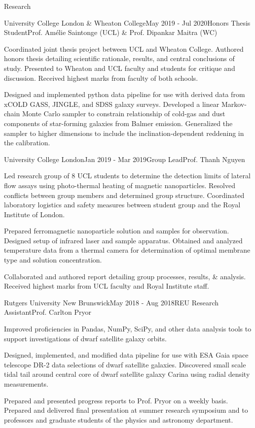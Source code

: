 \documentclass{resume} %
\begin{document}
\begin{rSection}{Research}
\begin{rSubsection}{University College London \& Wheaton College}{May 2019 - Jul 2020}{Honors Thesis Student}{Prof. Am\'{e}lie Saintonge (UCL) \& Prof. Dipankar Maitra (WC)}
\item Coordinated joint thesis project between UCL and Wheaton College. Authored honors thesis detailing scientific rationale, results, and central conclusions of study. Presented to Wheaton and UCL faculty and students for critique and discussion. Received highest marks from faculty of both schools.
\item Designed and implemented python data pipeline for use with derived data from xCOLD GASS, JINGLE, and SDSS galaxy surveys. Developed a linear Markov-chain Monte Carlo sampler to constrain relationship of cold-gas and dust components of star-forming galaxies from Balmer emission. Generalized the sampler to higher dimensions to include the inclination-dependent reddening in the calibration.
\end{rSubsection}
\begin{rSubsection}{University College London}{Jan 2019 - Mar 2019}{Group Lead}{Prof. Thanh Nguyen}
\item Led research group of 8 UCL students to determine the detection limits of lateral flow assays using photo-thermal heating of magnetic nanoparticles. Resolved conflicts between group members and determined group structure. Coordinated laboratory logistics and safety measures between student group and the Royal Institute of London.
\item Prepared ferromagnetic nanoparticle solution and samples for observation. Designed setup of infrared laser and sample apparatus. Obtained and analyzed temperature data from a thermal camera for determination of optimal membrane type and solution concentration.
\item Collaborated and authored report detailing group processes, results, \& analysis. Received highest marks from UCL faculty and Royal Institute staff.
\end{rSubsection}

\begin{rSubsection}{Rutgers University New Brunswick}{May 2018 - Aug 2018}{REU Research Assistant}{Prof. Carlton Pryor}
\item Improved proficiencies in Pandas, NumPy, SciPy, and other data analysis tools to support investigations of dwarf satellite galaxy orbits.
\item Designed, implemented, and modified data pipeline for use with ESA Gaia space telescope DR-2 data selections of dwarf satellite galaxies. Discovered small scale tidal tail around central core of dwarf satellite galaxy Carina using radial density measurements.
\item Prepared and presented progress reports to Prof. Pryor on a weekly basis. Prepared and delivered final presentation at summer research symposium and to professors and graduate students of the physics and astronomy department.
\end{rSubsection}



\end{rSection}
\end{document}
